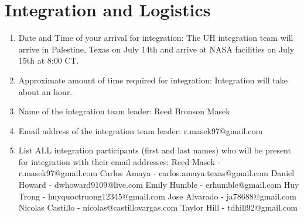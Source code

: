 \newpage
\section{Integration and Logistics}
\label{sec:Logistics}

\hspace*{0.5cm}
\begin{minipage}{\linewidth-0.5cm}
  \begin{enumerate}[label = \Alph*.]
  \item Date and Time of your arrival for integration: \newline
    The UH integration team will arrive in Palestine, Texas on July 14th and arrive at NASA facilities on July 15th at 8:00 CT.
  \item Approximate amount of time required for integration: \newline
    Integration will take about an hour.
  \item Name of the integration team leader: \newline
    Reed Bronson Masek    
  \item Email address of the integration team leader: \newline
    r.masek97@gmail.com
  \item List ALL integration participants (first and last names) who will be present for integration with their email addresses: \newline
    Reed Masek - r.masek97@gmail.com \newline
    Carlos Amaya - carlos.amaya.texas@gmail.com \newline
    Daniel Howard - dwhoward9109@live.com \newline
    Emily Humble - erhumble@gmail.com \newline
    Huy Trong - huyquoctruong12345@gmail.com \newline
    Jose Alvarado - ja78688@gmail.com \newline
    Nicolas Castillo - nicolas@castillovargas.com \newline
    Taylor Hill - tdhill92@gmail.com \newline    
  \end{enumerate}
\end{minipage}
\newpage
